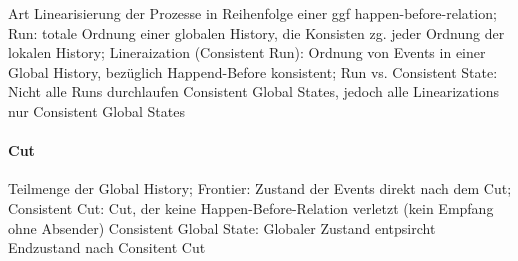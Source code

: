 \documentclass[pagesize,11pt,a4paper]{scrartcl}
\begin{document}
	Art Linearisierung der Prozesse in Reihenfolge einer ggf happen-before-relation;
	Run: totale Ordnung einer globalen History, die Konsisten zg. jeder Ordnung der lokalen History;
	Lineraization (Consistent Run): Ordnung von Events in einer Global History, bezüglich Happend-Before konsistent;
	Run vs. Consistent State: Nicht alle Runs durchlaufen Consistent Global States, jedoch alle Linearizations nur Consistent Global States

\paragraph*{Cut}
	Teilmenge der Global History;
	Frontier: Zustand der Events direkt nach dem Cut;
	Consistent Cut: Cut, der keine Happen-Before-Relation verletzt (kein Empfang ohne Absender)
	Consistent Global State: Globaler Zustand entpsircht Endzustand nach Consitent Cut
	
\end{document}
